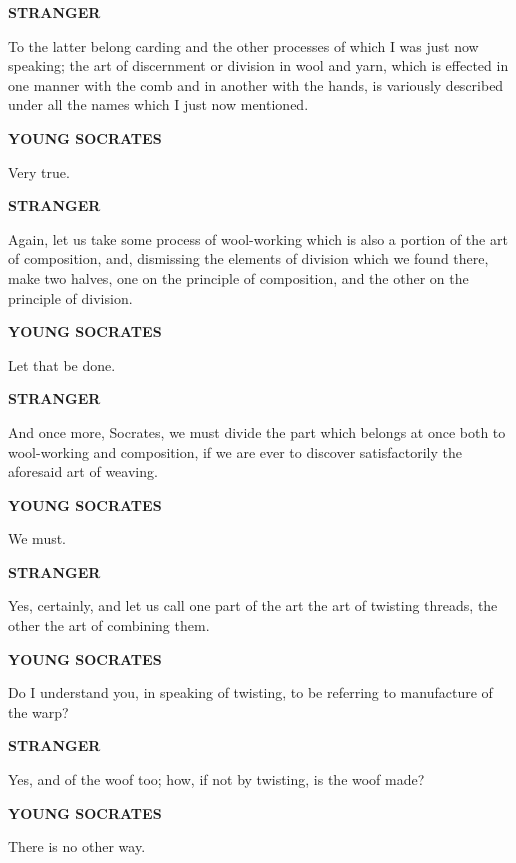 \documentclass[11pt,letter]{article}
\begin{document}
\par \textbf{STRANGER}
\par   To the latter belong carding and the other processes of which I was just now speaking; the art of discernment or division in wool and yarn, which is effected in one manner with the comb and in another with the hands, is variously described under all the names which I just now mentioned.

\par \textbf{YOUNG SOCRATES}
\par   Very true.

\par \textbf{STRANGER}
\par   Again, let us take some process of wool-working which is also a portion of the art of composition, and, dismissing the elements of division which we found there, make two halves, one on the principle of composition, and the other on the principle of division.

\par \textbf{YOUNG SOCRATES}
\par   Let that be done.

\par \textbf{STRANGER}
\par   And once more, Socrates, we must divide the part which belongs at once both to wool-working and composition, if we are ever to discover satisfactorily the aforesaid art of weaving.

\par \textbf{YOUNG SOCRATES}
\par   We must.

\par \textbf{STRANGER}
\par   Yes, certainly, and let us call one part of the art the art of twisting threads, the other the art of combining them.

\par \textbf{YOUNG SOCRATES}
\par   Do I understand you, in speaking of twisting, to be referring to manufacture of the warp?

\par \textbf{STRANGER}
\par   Yes, and of the woof too; how, if not by twisting, is the woof made?

\par \textbf{YOUNG SOCRATES}
\par   There is no other way.
\end{document}
